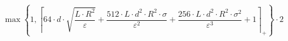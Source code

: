 \[\max\left\{ 1, \left\lceil 64 \cdot d \cdot \sqrt{\frac{L \cdot R^{2}}{\varepsilon}} + \frac{512 \cdot L \cdot d^{2} \cdot R^{2} \cdot \sigma}{\varepsilon^{2}} + \frac{256 \cdot L \cdot d^{2} \cdot R^{2} \cdot \sigma^{2}}{\varepsilon^{3}} + 1 \right\rceil_{+} \right\} \cdot 2\]
